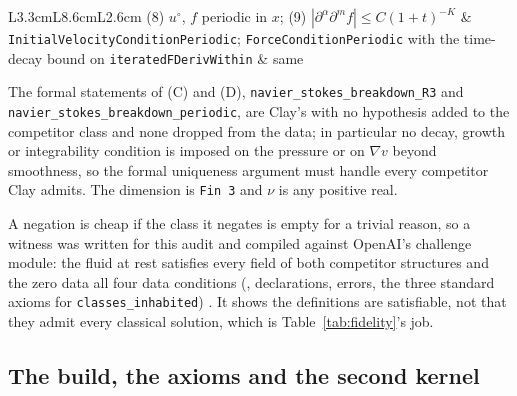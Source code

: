 \documentclass[11pt]{article}
\newcommand{\lean}[1]{\texttt{#1}}
\begin{document}
\begin{table}[t]
\begin{tabular}{L{3.3cm}L{8.6cm}L{2.6cm}}
(8) $u^\circ$, $f$ periodic in $x$; (9) $|\partial^\alpha\partial^mf|\le C(1+t)^{-K}$ & \lean{InitialVelocityConditionPeriodic}; \lean{ForceConditionPeriodic} with the time-decay bound on \lean{iteratedFDerivWithin} & same \\
\bottomrule\end{tabular}
\caption{Clay's hypotheses against the formal statement, one row per hypothesis
(\FidelityRows{} rows; \FidelitySame{} read \emph{same}, \FidelityEquivalent{}
\emph{equivalent}). The first six rows are the competitor class $S$, the last three the
data hypotheses $H$. Transcribed from the record \cite{Records}.}\label{tab:fidelity}
\end{table}

\begin{proposition}\label{prop:fidelity}
The formal statements of (C) and (D), \lean{navier\_stokes\_breakdown\_R3} and
\lean{navier\_stokes\_breakdown\_periodic}, are Clay's with no hypothesis added to the
competitor class and none dropped from the data; in particular no decay, growth or
integrability condition is imposed on the pressure or on $\nabla v$ beyond smoothness, so the
formal uniqueness argument must handle every competitor Clay admits. The dimension is
\lean{Fin~3} and $\nu$ is any positive real.
\end{proposition}

A negation is cheap if the class it negates is empty for a trivial reason, so a witness was
written for this audit and compiled against OpenAI's challenge module: the fluid at rest
satisfies every field of both competitor structures and the zero data all four data
conditions (\lean{\NonVacuityFile}, \NonVacuityDecls{} declarations, \NonVacuityErrors{}
errors, the three standard axioms for \lean{classes\_inhabited}) \cite{Records}. It shows
the definitions are satisfiable, not that they admit every classical solution, which is
Table~\ref{tab:fidelity}'s job.

\subsection{The build, the axioms and the second kernel}\label{sec:build}
\end{document}
